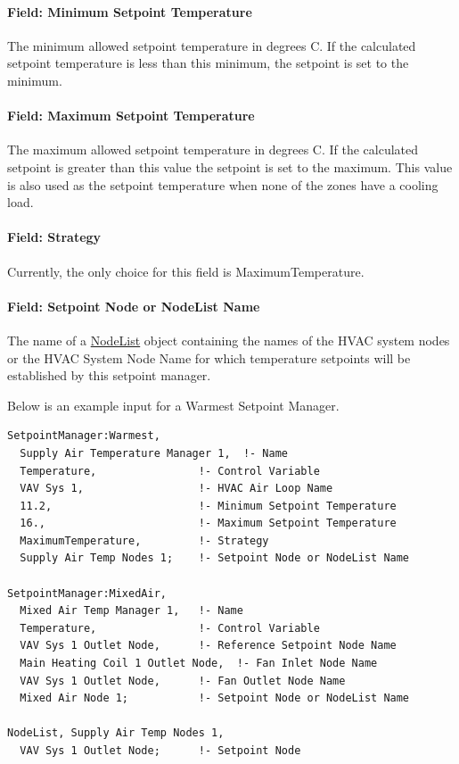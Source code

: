 \paragraph{Field: Minimum Setpoint Temperature}\label{field-minimum-setpoint-temperature-1}

The minimum allowed setpoint temperature in degrees C. If the calculated setpoint temperature is less than this minimum, the setpoint is set to the minimum.

\paragraph{Field: Maximum Setpoint Temperature}\label{field-maximum-setpoint-temperature-1}

The maximum allowed setpoint temperature in degrees C. If the calculated setpoint is greater than this value the setpoint is set to the maximum. This value is also used as the setpoint temperature when none of the zones have a cooling load.

\paragraph{Field: Strategy}\label{field-strategy}

Currently, the only choice for this field is MaximumTemperature.

\paragraph{Field: Setpoint Node or NodeList Name}\label{field-setpoint-node-or-nodelist-name-10}

The name of a \hyperref[nodelist]{NodeList} object containing the names of the HVAC system nodes or the HVAC System Node Name for which temperature setpoints will be established by this setpoint manager.

Below is an example input for a Warmest Setpoint Manager.

\begin{lstlisting}
SetpointManager:Warmest,
  Supply Air Temperature Manager 1,  !- Name
  Temperature,                !- Control Variable
  VAV Sys 1,                  !- HVAC Air Loop Name
  11.2,                       !- Minimum Setpoint Temperature
  16.,                        !- Maximum Setpoint Temperature
  MaximumTemperature,         !- Strategy
  Supply Air Temp Nodes 1;    !- Setpoint Node or NodeList Name

SetpointManager:MixedAir,
  Mixed Air Temp Manager 1,   !- Name
  Temperature,                !- Control Variable
  VAV Sys 1 Outlet Node,      !- Reference Setpoint Node Name
  Main Heating Coil 1 Outlet Node,  !- Fan Inlet Node Name
  VAV Sys 1 Outlet Node,      !- Fan Outlet Node Name
  Mixed Air Node 1;           !- Setpoint Node or NodeList Name

NodeList, Supply Air Temp Nodes 1,
  VAV Sys 1 Outlet Node;      !- Setpoint Node
\end{lstlisting}

